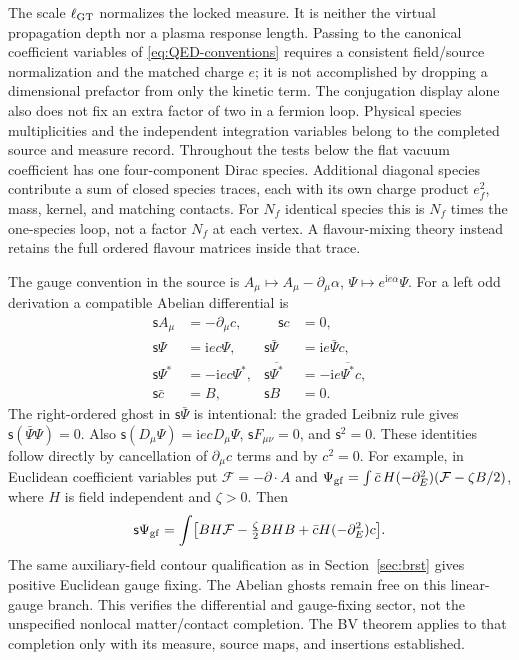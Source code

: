 \documentclass[final,5p,times,twocolumn,numbers,nopreprintline]{elsarticle}
\numberwithin{equation}{section}
\theoremstyle{definition}
\theoremstyle{remark}
\newcommand{\ii}{\mathrm i}
\newcommand{\BR}{\mathsf s}
\begin{document}
The scale \(\ell_{\rm GT}\) normalizes the locked measure. It is neither
the virtual propagation depth nor a plasma response length. Passing to
the canonical coefficient variables of \eqref{eq:QED-conventions}
requires a consistent field/source normalization and the matched charge
\(e\); it is not accomplished by dropping a dimensional prefactor from
only the kinetic term. The conjugation display alone also does not fix
an extra factor of two in a fermion loop. Physical species multiplicities
and the independent integration variables belong to the completed
source and measure record. Throughout the tests below the flat vacuum
coefficient has one four-component Dirac species. Additional diagonal
species contribute a sum of closed species traces, each with its own
charge product \(e_f^2\), mass, kernel, and matching contacts. For
\(N_f\) identical species this is \(N_f\) times the one-species loop,
not a factor \(N_f\) at each vertex. A flavour-mixing theory instead
retains the full ordered flavour matrices inside that trace.

The gauge convention in the source is
\(A_\mu\mapsto A_\mu-\partial_\mu\alpha\),
\(\Psi\mapsto e^{\ii e\alpha}\Psi\). For a left odd derivation a
compatible Abelian differential is
\begin{equation}
\begin{aligned}
 \BR A_\mu&=-\partial_\mu c,&\quad \BR c&=0,\\
 \BR\Psi&=\ii e c\Psi,&\BR\bar\Psi&=\ii e\bar\Psi c,\\
 \BR\Psi^*&=-\ii e c\Psi^*,&
 \BR\overline{\Psi^*}&=-\ii e\overline{\Psi^*}c,\\
 \BR\bar c&=B,&\BR B&=0.
\end{aligned}
\label{eq:OQED-Abelian-BRST}
\end{equation}
The right-ordered ghost in \(\BR\bar\Psi\) is intentional: the graded
Leibniz rule gives \(\BR(\bar\Psi\Psi)=0\). Also
\(\BR(D_\mu\Psi)=\ii e cD_\mu\Psi\), \(\BR F_{\mu\nu}=0\),
and \(\BR^2=0\). These identities follow directly by cancellation of
\(\partial_\mu c\) terms and by \(c^2=0\).
For example, in Euclidean coefficient variables put
\(\mathcal F=-\partial\cdot A\) and
\(\Psi_{\rm gf}=\int\bar c\,H(-\partial_E^2)
(\mathcal F-\zeta B/2)\), where \(H\) is field independent and
\(\zeta>0\). Then
\[
 \BR\Psi_{\rm gf}=\int\bigl[BH\mathcal F-\tfrac\zeta2BHB
                  +\bar cH(-\partial_E^2)c\bigr].
\]
The same auxiliary-field contour qualification as in
Section~\ref{sec:brst} gives positive Euclidean gauge fixing. The
Abelian ghosts remain free on this linear-gauge branch. This verifies
the differential and gauge-fixing sector, not the unspecified nonlocal
matter/contact completion. The BV theorem applies to that completion
only with its measure, source maps, and insertions established.
\end{document}
